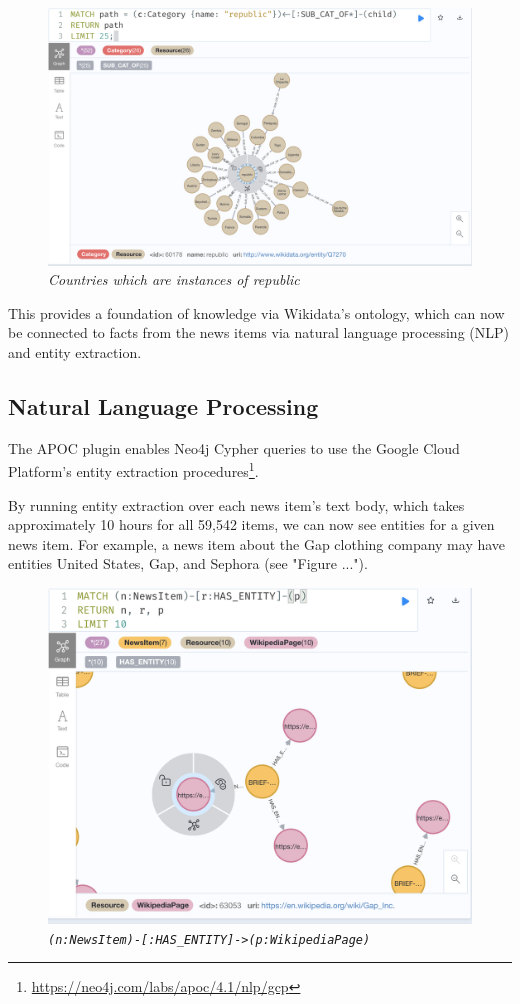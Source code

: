 \documentclass[11pt]{article}
\begin{document}
\begin{figure}
  \centerline{\includegraphics[scale=0.5]{category-republic.png}}
  \caption{\textit{Countries which are instances of republic}}
\end{figure}

This provides a foundation of knowledge via Wikidata's ontology, which can now be connected to facts from the news items via natural language processing (NLP) and entity extraction.

\subsection{Natural Language Processing}

The APOC plugin enables Neo4j Cypher queries to use the Google Cloud Platform's entity extraction procedures\footnote{\url{https://neo4j.com/labs/apoc/4.1/nlp/gcp}}.

By running entity extraction over each news item's text body, which takes approximately 10 hours for all 59,542 items, we can now see entities for a given news item. For example, a news item about the Gap clothing company may have entities United States, Gap, and Sephora (see "Figure ...").

\begin{figure}
  \centerline{\includegraphics[scale=0.5]{has-entity.png}}
  \caption{\textit{\lstinline{(n:NewsItem)-[:HAS_ENTITY]->(p:WikipediaPage)}}}
\end{figure}
\end{document}
